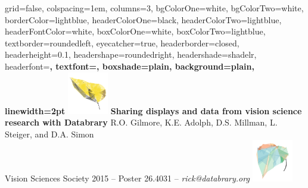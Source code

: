 \documentclass[landscape,final,a0paper,fontscale=0.285]{baposter}
\begin{document}


\begin{poster}%
  {
  grid=false,
  colspacing=1em,
  columns=3,
  bgColorOne=white,
  bgColorTwo=white,
  borderColor=lightblue,
  headerColorOne=black,
  headerColorTwo=lightblue,
  headerFontColor=white,
  boxColorOne=white,
  boxColorTwo=lightblue,
  textborder=roundedleft,
  eyecatcher=true,
  headerborder=closed,
  headerheight=0.1\textheight,
  headershape=roundedright,
  headershade=shadelr,
  headerfont=\Large\bf\textsc, %
  textfont={\setlength{\parindent}{1.5em}},
  boxshade=plain,
  background=plain,
  linewidth=2pt
  }
  {
    \includegraphics[height=5em]{img/datavyu-leaf-large.png}
  } 
  {\bf{Sharing displays and data from vision science research with Databrary} }
  {R.O. Gilmore, K.E. Adolph, D.S. Millman, L. Steiger, and D.A. Simon \\
   \small{Vision Sciences Society 2015 -- Poster 26.4031 -- \emph{rick@databrary.org}}}
  {
    \includegraphics[height=5em]{img/databrary-leaf-large.png}
  }



\end{poster}
\end{document}
